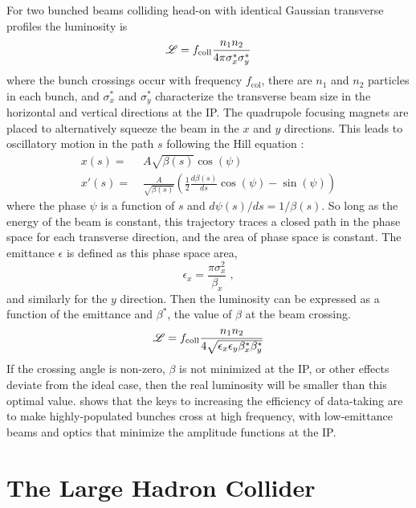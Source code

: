 For two bunched beams colliding head-on with identical Gaussian transverse profiles the luminosity is
\begin{equation}
\mathscr{L} = f_\mathrm{coll} \frac{n_1 n_2}{4 \pi \sigma_x^* \sigma_y^*}
\end{equation}
where the bunch crossings occur with frequency $f_\mathrm{col}$, there are $n_1$ and $n_2$ particles in each bunch, and $\sigma_x^*$ and $\sigma_y^*$ characterize the transverse beam size in the horizontal and vertical directions at the \ac{IP}.
The quadrupole focusing magnets are placed to alternatively squeeze the beam in the $x$ and $y$ directions.
This leads to oscillatory motion in the path $s$ following the Hill equation \cite{Tanabashi:2018oca}:
\begin{align}
x(s) =& \; A \sqrt{\beta(s)} \cos (\psi) \\
x'(s) =& \; \frac{A}{\sqrt{\beta(s)}} \left( \frac{1}{2} \frac{d\beta(s)}{ds} \cos(\psi) - \sin(\psi) \right)
\end{align}
where the phase $\psi$ is a function of $s$ and $d\psi(s)/ds = 1/\beta(s)$.
So long as the energy of the beam is constant, this trajectory traces a closed path in the phase space for each transverse direction, and the area of phase space is constant.
The emittance $\epsilon$ is defined as this phase space area,
\begin{equation}
\epsilon_x = \frac{\pi \sigma_x^2}{\beta_x} \; ,
\end{equation}
and similarly for the $y$ direction.
Then the luminosity can be expressed as a function of the emittance and $\beta^*$, the value of $\beta$ at the beam crossing.
\begin{equation}
\label{eq:lumi}
\mathscr{L} = f_\mathrm{coll} \frac{n_1 n_2}{4 \sqrt{\epsilon_x \epsilon_y \beta_x^* \beta_y^*}}
\end{equation}
If the crossing angle is non-zero, $\beta$ is not minimized at the \ac{IP}, or other effects deviate from the ideal case, then the real luminosity will be smaller than this optimal value.
 shows that the keys to increasing the efficiency of data-taking are to make highly-populated bunches cross at high frequency, with low-emittance beams and optics that minimize the amplitude functions at the \ac{IP}.

\section{The Large Hadron Collider}

